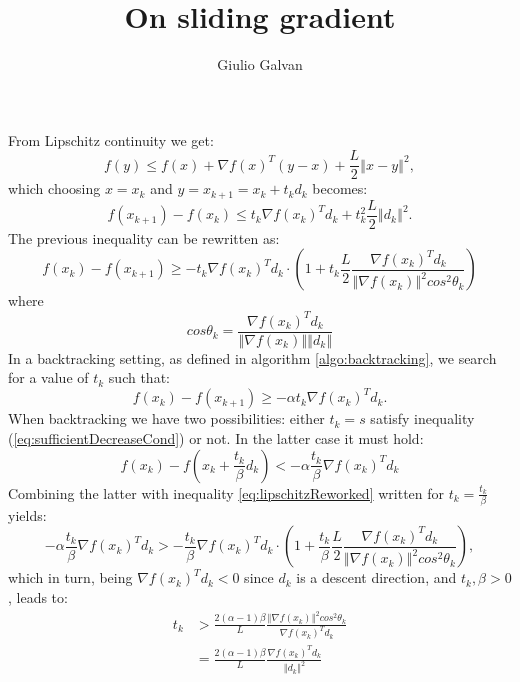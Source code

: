 \documentclass{article}
\title{On sliding gradient}
\author{Giulio Galvan}
\newcommand{\norm}[1]{\left\Vert #1 \right\Vert}
\begin{document}
	\maketitle

\noindent	
From Lipschitz continuity we get:
\begin{equation}
	f(y) \leq f(x) + \nabla f(x)^T(y-x) + \frac{L}{2}\norm{x-y}^2,
\end{equation}
which choosing $x=x_k$ and $y=x_{k+1}=x_k + t_k d_k$ becomes:
\begin{equation}
	f(x_{k+1})-f(x_k) \leq t_k\nabla f(x_k)^Td_k+ t_k^2\frac{L}{2}\norm{d_k}^2.
\end{equation}
The previous inequality can be rewritten as:
\begin{equation}
f(x_k)- f(x_{k+1}) \geq - t_k\nabla f(x_k)^Td_k\cdot \left(1+t_k\frac{L}{2}\frac{\nabla f(x_k)^Td_k}{\norm{\nabla f(x_k)}^2 cos^2\theta_k}\right)
\label{eq:lipschitzReworked}
\end{equation}
where
\begin{equation}
cos\theta_k=\frac{\nabla f(x_k)^Td_k}{\norm{\nabla f(x_k)}\norm{d_k}}
\end{equation}
In a backtracking setting, as defined in algorithm \ref{algo:backtracking}, we search for a value of $t_k$ such that:
\begin{equation}
	f(x_k) - f(x_{k+1})\geq -\alpha t_k \nabla f(x_k)^Td_k.
	\label{eq:sufficientDecreaseCond}
\end{equation}
When backtracking we have two possibilities: either $t_k=s$ satisfy inequality (\ref{eq:sufficientDecreaseCond}) or not. In the latter case it must hold:
\begin{equation}
		f(x_k)-f(x_{k}+\frac{t_k}{\beta}d_k) < -\alpha \frac{t_k}{\beta} \nabla f(x_k)^Td_k
\label{eq:sufficientDecreaseViolated}
\end{equation}
Combining the latter with inequality \ref{eq:lipschitzReworked} written for $t_k=\frac{t_k}{\beta}$ yields:
\begin{equation}
-\alpha \frac{t_k}{\beta} \nabla f(x_k)^Td_k > - \frac{t_k}{\beta}\nabla f(x_k)^Td_k\cdot \left(1+\frac{t_k}{\beta}\frac{L}{2}\frac{\nabla f(x_k)^Td_k}{\norm{\nabla f(x_k)}^2 cos^2\theta_k}\right),
\end{equation}
which in turn, being $\nabla f(x_k)^Td_k<0$ since $d_k$ is a descent direction, and $t_k,\beta>0$, leads to:
\begin{align}
	t_k &> \frac{2(\alpha-1)\beta}{L} \frac{\norm{\nabla f(x_k)}^2 cos^2\theta_k}{\nabla f(x_k)^Td_k} 	\label{eq:lowerBound}\\
	&=\frac{2(\alpha-1)\beta}{L}\frac{\nabla f(x_k)^Td_k}{\norm{d_k}^2}
\end{align}
\end{document}
